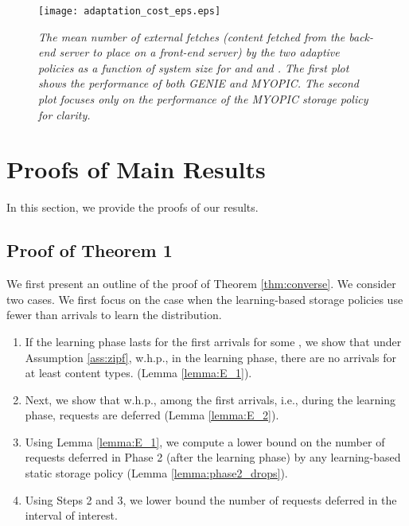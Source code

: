 \documentclass[10pt, conference, letterpaper]{IEEEtran}
\begin{document}
\begin{figure}[h]
	\begin{center}
		\texttt{[image: adaptation\_cost\_eps.eps]}
		\caption{\sl The mean number of external fetches (content fetched from the back-end server to place on a front-end server) by the two adaptive policies as a function of system size  for  and  and . The first plot shows the performance of both GENIE and MYOPIC. The second plot focuses only on the performance of the MYOPIC storage policy for clarity. \label{fig:adaptation_cost}}
	\end{center}
\end{figure}












\section{Proofs of Main Results}
\label{proofs}
In this section, we provide the proofs of our results. 
\subsection{Proof of Theorem 1}
\label{sec:proof2}

\noindent We first present an outline of the proof of Theorem \ref{thm:converse}. We consider two cases. We first focus on the case when the learning-based storage policies use fewer than  arrivals to learn the distribution.
\begin{enumerate}
	\item If the learning phase lasts for the first  arrivals for some , we show that under Assumption \ref{ass:zipf}, w.h.p., in the learning phase, there are no arrivals for at least  content types. (Lemma \ref{lemma:E_1}).
	\item Next, we show that w.h.p., among the first  arrivals, i.e., during the learning phase,  requests are deferred (Lemma \ref{lemma:E_2}).
	\item Using Lemma \ref{lemma:E_1}, we compute a lower bound on the number of requests deferred in Phase 2 (after the learning phase) by any learning-based static storage policy (Lemma \ref{lemma:phase2_drops}).
	\item Using Steps 2 and 3, we lower bound the number of requests deferred in the interval of interest.
\end{enumerate}
\end{document}
